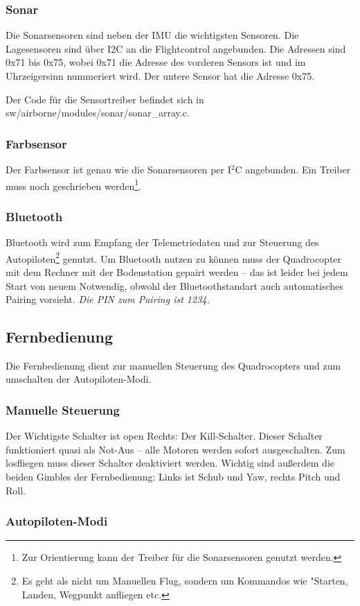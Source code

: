 \subsubsection{Sonar}
Die Sonarsensoren sind neben der IMU die wichtigsten Sensoren. Die Lagesensoren sind über I2C an die Flightcontrol angebunden.
Die Adressen sind 0x71 bis 0x75, wobei 0x71 die Adresse des vorderen Sensors ist und im Uhrzeigersinn nummeriert wird.
Der untere Sensor hat die Adresse 0x75.

Der Code für die Sensortreiber befindet sich in sw/airborne/modules/sonar/sonar\_array.c.

\subsubsection{Farbsensor}
Der Farbsensor ist genau wie die Sonarsensoren per I$^2$C angebunden. Ein Treiber muss noch geschrieben werden\footnote{Zur Orientierung kann der Treiber für die Sonarsensoren genutzt werden.}.


\subsubsection{Bluetooth}
Bluetooth wird zum Empfang der Telemetriedaten und zur Steuerung des Autopiloten\footnote{Es geht als nicht um Manuellen Flug, sondern um Kommandos wie "Starten, Landen, Wegpunkt anfliegen etc.} genutzt.
Um Bluetooth nutzen zu können muss der Quadrocopter mit dem Rechner mit der Bodenstation gepairt werden – das ist leider bei jedem Start von neuem Notwendig, obwohl der Bluetoothstandart auch automatisches Pairing vorsieht.
\emph{Die PIN zum Pairing ist 1234.}


\subsection{Fernbedienung}
Die Fernbedienung dient zur manuellen Steuerung des Quadrocopters und zum umschalten der Autopiloten-Modi.

\subsubsection{Manuelle Steuerung}
Der Wichtigste Schalter ist open Rechts: Der Kill-Schalter. Dieser Schalter funktioniert quasi als Not-Aus – alle Motoren werden sofort ausgeschalten.
Zum losfliegen muss dieser Schalter deaktiviert werden.
Wichtig sind außerdem die beiden Gimbles der Fernbedienung: Links ist Schub und Yaw, rechts Pitch und Roll.

\subsubsection{Autopiloten-Modi}
